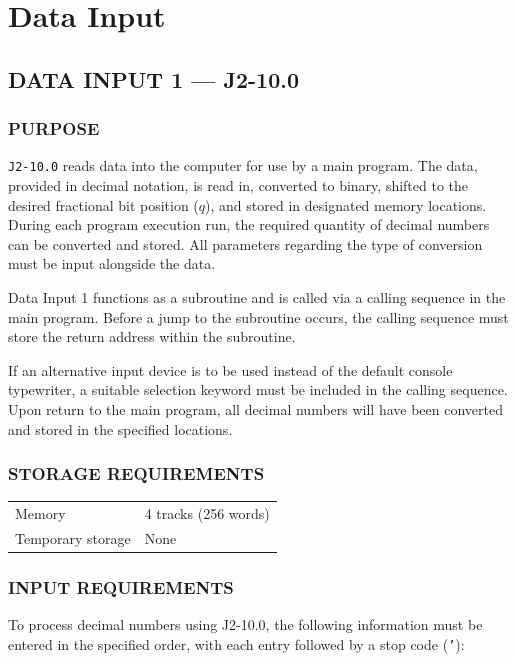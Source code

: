 \section{Data Input}
\subsection*{DATA INPUT 1 --- J2-10.0}
\label{sec:data-input-1}

\subsubsection*{PURPOSE}
\texttt{J2-10.0} reads data into the computer for use by a main program. The data, provided in decimal notation, is read in, converted to binary, shifted to the desired fractional bit position ($q$), and stored in designated memory locations. During each program execution run, the required quantity of decimal numbers can be converted and stored. All parameters regarding the type of conversion must be input alongside the data.

Data Input 1 functions as a subroutine and is called via a calling sequence in the main program. Before a jump to the subroutine occurs, the calling sequence must store the return address within the subroutine.

If an alternative input device is to be used instead of the default console typewriter, a suitable selection keyword must be included in the calling sequence. Upon return to the main program, all decimal numbers will have been converted and stored in the specified locations.

\subsubsection*{STORAGE REQUIREMENTS}
\begin{center}
\begin{tabular}{ll}
    \toprule
    Memory & 4 tracks (256 words) \\
    Temporary storage    & None \\
    \bottomrule
\end{tabular}
\end{center}

\subsubsection*{INPUT REQUIREMENTS}
To process decimal numbers using J2-10.0, the following information must be entered in the specified order, with each entry followed by a stop code (\texttt{'}):

